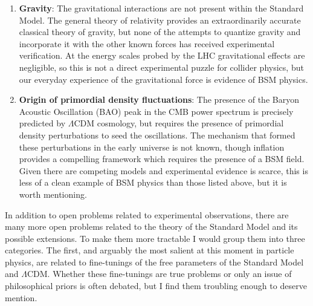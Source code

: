 \begin{enumerate}
{        A good explanation for this dark energy is a non-zero cosmological constant $\Lambda$, however this model has significant theoretical issues as discussed below.
        Additionally measurements of the expansion rate of the universe have produced inconsistencies.
        The $\Lambda$CDM model of cosmology parametrizes the expansion of the universe through the Hubble constant.
        This constant can be measured through two probes: the cosmic microwave background~\cite{Planck:2018vyg} and local distance-ladder observations~\cite{Riess:2021jrx}.
        However these two approaches yield values of the Hubble constant $H_0$ that disagree at the 4--5$\sigma$ level.
        This tension could be caused by an unaccounted for systematic effect and is under very active research.
        However if confirmed this would be a clear sign of beyond $\Lambda$CDM cosmology.
    }
    \item{
        \textbf{Gravity}: The gravitational interactions are not present within the Standard Model.
        The general theory of relativity provides an extraordinarily accurate classical theory of gravity, but none of the attempts to quantize gravity and incorporate it with the other known forces has received experimental verification.
        At the energy scales probed by the LHC gravitational effects are negligible, so this is not a direct experimental puzzle for collider physics, but our everyday experience of the gravitational force is evidence of BSM physics.
    }
    \item{
        \textbf{Origin of primordial density fluctuations}: The presence of the Baryon Acoustic Oscillation (BAO) peak in the CMB power spectrum is precisely predicted by $\Lambda$CDM cosmology, but requires the presence of primordial density perturbations to seed the oscillations.
        The mechanism that formed these perturbations in the early universe is not known, though inflation provides a compelling framework which requires the presence of a BSM field.
        Given there are competing models and experimental evidence is scarce, this is less of a clean example of BSM physics than those listed above, but it is worth mentioning.
    }
\end{enumerate}

In addition to open problems related to experimental observations, there are many more open problems related to the theory of the Standard Model and its possible extensions.
To make them more tractable I would group them into three categories.
The first, and arguably the most salient at this moment in particle physics, are related to fine-tunings of the free parameters of the Standard Model and $\Lambda$CDM.
Whether these fine-tunings are true problems or only an issue of philosophical priors is often debated, but I find them troubling enough to deserve mention.


